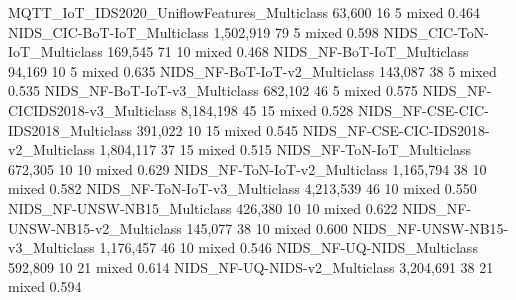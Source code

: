 MQTT_IoT_IDS2020_UniflowFeatures_Multiclass                             63,600       16       5         mixed   0.464
NIDS_CIC-BoT-IoT_Multiclass                                          1,502,919       79       5         mixed   0.598
NIDS_CIC-ToN-IoT_Multiclass                                            169,545       71      10         mixed   0.468
NIDS_NF-BoT-IoT_Multiclass                                              94,169       10       5         mixed   0.635
NIDS_NF-BoT-IoT-v2_Multiclass                                          143,087       38       5         mixed   0.535
NIDS_NF-BoT-IoT-v3_Multiclass                                          682,102       46       5         mixed   0.575
NIDS_NF-CICIDS2018-v3_Multiclass                                     8,184,198       45      15         mixed   0.528
NIDS_NF-CSE-CIC-IDS2018_Multiclass                                     391,022       10      15         mixed   0.545
NIDS_NF-CSE-CIC-IDS2018-v2_Multiclass                                1,804,117       37      15         mixed   0.515
NIDS_NF-ToN-IoT_Multiclass                                             672,305       10      10         mixed   0.629
NIDS_NF-ToN-IoT-v2_Multiclass                                        1,165,794       38      10         mixed   0.582
NIDS_NF-ToN-IoT-v3_Multiclass                                        4,213,539       46      10         mixed   0.550
NIDS_NF-UNSW-NB15_Multiclass                                           426,380       10      10         mixed   0.622
NIDS_NF-UNSW-NB15-v2_Multiclass                                        145,077       38      10         mixed   0.600
NIDS_NF-UNSW-NB15-v3_Multiclass                                      1,176,457       46      10         mixed   0.546
NIDS_NF-UQ-NIDS_Multiclass                                             592,809       10      21         mixed   0.614
NIDS_NF-UQ-NIDS-v2_Multiclass                                        3,204,691       38      21         mixed   0.594
